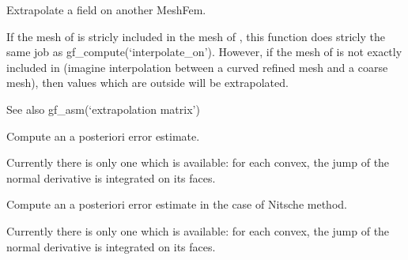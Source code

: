 \documentclass[a4paper,11pt,english]{sphinxmanual}
\begin{document}

\begin{fulllineitems}
\label{\detokenize{python/cmdref_Module compute:getfem.compute_extrapolate_on}}
Extrapolate a field on another MeshFem.

If the mesh of  is stricly included in the mesh of , this
function does stricly the same job as gf\_compute(‘interpolate\_on’).
However, if the mesh of  is not exactly included in 
(imagine interpolation between a curved refined mesh and a coarse
mesh), then values which are outside  will be
extrapolated.

See also gf\_asm(‘extrapolation matrix’)

\end{fulllineitems}


\begin{fulllineitems}
\label{\detokenize{python/cmdref_Module compute:getfem.compute_error_estimate}}
Compute an a posteriori error estimate.

Currently there is only one which is available: for each convex,
the jump of the normal derivative is integrated on its faces.

\end{fulllineitems}


\begin{fulllineitems}
\label{\detokenize{python/cmdref_Module compute:getfem.compute_error_estimate_nitsche}}
Compute an a posteriori error estimate in the case of Nitsche method.

Currently there is only one which is available: for each convex,
the jump of the normal derivative is integrated on its faces.

\end{fulllineitems}
\end{document}
